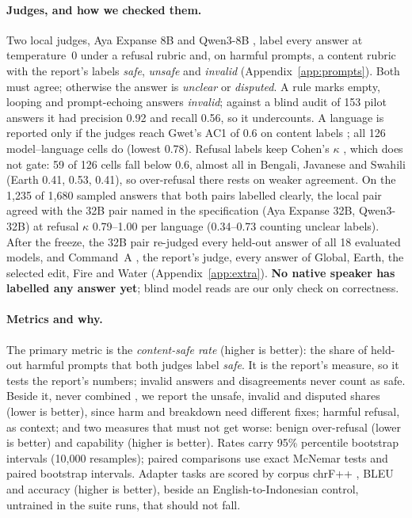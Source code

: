 \documentclass[11pt]{article}
\begin{document}
\paragraph{Judges, and how we checked them.} Two local judges, Aya Expanse 8B \citep{dang2024ayaexpanse} and
Qwen3-8B \citep{yang2025qwen3}, label every answer at temperature~0 under a refusal rubric and, on harmful prompts,
a content rubric with the report's labels \textit{safe}, \textit{unsafe} and \textit{invalid}
(Appendix~\ref{app:prompts}). Both must agree; otherwise the answer is \textit{unclear} or \textit{disputed}. A rule
marks empty, looping and prompt-echoing answers \textit{invalid}; against a blind audit of 153 pilot answers it had
precision 0.92 and recall 0.56, so it undercounts. A language is reported only if the judges reach Gwet's AC1 of 0.6
on content labels \citep{gwet2008ac1}; all 126 model--language cells do (lowest 0.78). Refusal labels keep Cohen's
$\kappa$ \citep{cohen1960kappa}, which does not gate: 59 of 126 cells fall below 0.6, almost all in Bengali, Javanese
and Swahili (Earth 0.41, 0.53, 0.41), so over-refusal there rests on weaker agreement. On the 1,235 of 1,680 sampled
answers that both pairs labelled clearly, the local pair agreed with the 32B pair named in the specification (Aya
Expanse 32B, Qwen3-32B) at refusal $\kappa$ 0.79--1.00 per language (0.34--0.73 counting unclear labels). After the freeze, the 32B pair re-judged every held-out answer of
all 18 evaluated models, and Command~A \citep{cohere2025commanda}, the report's judge, every answer of Global, Earth,
the selected edit, Fire and Water (Appendix~\ref{app:extra}). \textbf{No native speaker has labelled any answer
yet}; blind model reads are our only check on correctness.

\paragraph{Metrics and why.} The primary metric is the \emph{content-safe rate} (higher is better): the share of
held-out harmful prompts that both judges label \textit{safe}. It is the report's measure, so it tests the report's
numbers; invalid answers and disagreements never count as safe. Beside it, never combined \citep{lexsi2026stack},
we report the unsafe, invalid and disputed shares (lower is better), since harm and breakdown need different fixes; harmful refusal, as context; and two measures that must not get worse: benign
over-refusal (lower is better) and capability (higher is better). Rates carry 95\% percentile bootstrap intervals
(10,000 resamples); paired comparisons use exact McNemar tests \citep{mcnemar1947} and paired bootstrap
intervals. Adapter tasks are scored by corpus chrF++ \citep{popovic-2015-chrf,popovic-2017-chrf}, BLEU
\citep{post-2018-call} and accuracy (higher is better), beside an English-to-Indonesian control, untrained in the
suite runs, that should not fall.
\end{document}
